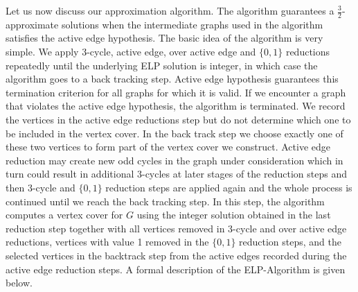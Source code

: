 \documentclass[12pt]{article}
\begin{document}
Let us now discuss our approximation algorithm. The algorithm
guarantees a $\frac{3}{2}$-approximate solutions when the
intermediate graphs used in the algorithm satisfies the active edge
hypothesis. The basic idea of the algorithm is very simple. We apply
3-cycle, active edge, over active edge and $\{0,1\}$ reductions repeatedly until  the
underlying ELP solution is integer, in which case the algorithm goes
to a back tracking step. Active edge hypothesis guarantees this
termination criterion for all graphs for which it is valid. If we
encounter a graph that violates the active edge hypothesis, the
algorithm is terminated. We record the vertices in the active edge
reductions step but do not determine which one to be included in the
vertex cover. In the back track step we choose exactly one of these
two vertices to form part of the vertex cover we construct. Active
edge reduction may create  new odd cycles in the graph under
consideration which in turn could result in additional 3-cycles at
later stages of the reduction steps and then 3-cycle and $\{0,1\}$
reduction steps are applied again and the whole process is continued
until we reach the back tracking step. In this step, the algorithm
computes a vertex cover for $G$ using the integer solution obtained
in the last reduction step together with all vertices removed in
3-cycle and over active edge reductions, vertices with value 1 removed in the $\{0,1\}$
reduction steps, and the selected vertices in the backtrack step
from the active edges recorded during the active edge reduction
steps. A formal description of the ELP-Algorithm is given below.
\end{document}
